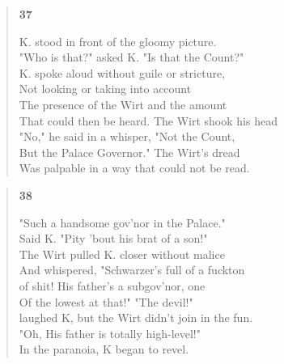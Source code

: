 \documentclass{article}
\begin{document}
\begin{verse}
  \begin{center}
    \textbf{37} \\
  \end{center}
  K. stood in front of the gloomy picture. \\
  "Who is that?" asked K. "Is that the Count?" \\
  K. spoke aloud without guile or stricture, \\
  Not looking or taking into account \\
  The presence of the Wirt and the amount \\
  That could then be heard. The Wirt shook his head \\
  "No," he said in a whisper, "Not the Count, \\
  But the Palace Governor." The Wirt's dread \\
  Was palpable in a way that could not be read.
\end{verse}

\begin{verse}
  \begin{center}
    \textbf{38} \\
  \end{center}
  "Such a handsome gov'nor in the Palace." \\
  Said K. "Pity 'bout his brat of a son!" \\
  The Wirt pulled K. closer without malice \\
  And whispered, "Schwarzer's full of a fuckton \\
  of shit! His father's a subgov'nor, one \\
  Of the lowest at that!" "The devil!" \\
  laughed K, but the Wirt didn't join in the fun. \\
  "Oh, His father is totally high-level!" \\
  In the paranoia, K began to revel. \\
\end{verse}
\end{document}
